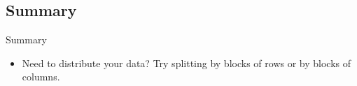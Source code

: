 \subsection{Summary}
\makesubcontentsslidessec


\begin{frame}[fragile]
  \begin{block}{Summary}\pause
    \begin{itemize}
      \item Need to distribute your data? Try splitting by blocks of
        rows or by blocks of columns.
    \end{itemize}
\end{block}
\end{frame}